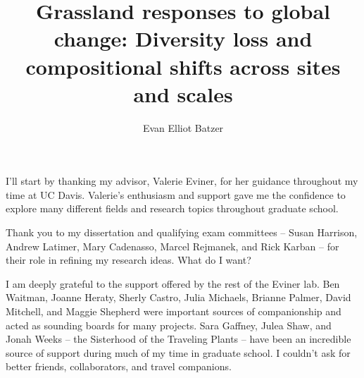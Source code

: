 \documentclass[twoside,12pt,final]{ucthesis-CA2012}
\begin{document}
\begin{ucfrontmatter}


  \title{Grassland responses to global change: Diversity loss and compositional shifts across sites and scales}
  \author{Evan Elliot Batzer}

   
  \othermemberC{} %
  
	\maketitle
	
  
\begin{acknowledgements}
    I'll start by thanking my advisor, Valerie Eviner, for her guidance throughout my time at UC Davis. Valerie's enthusiasm and support gave me the confidence to explore many different fields and research topics throughout graduate school.

    Thank you to my dissertation and qualifying exam committees -- Susan Harrison, Andrew Latimer, Mary Cadenasso, Marcel Rejmanek, and Rick Karban -- for their role in refining my research ideas. What do I want?

    I am deeply grateful to the support offered by the rest of the Eviner lab. Ben Waitman, Joanne Heraty, Sherly Castro, Julia Michaels, Brianne Palmer, David Mitchell, and Maggie Shepherd were important sources of companionship and acted as sounding boards for many projects. Sara Gaffney, Julea Shaw, and Jonah Weeks -- the Sisterhood of the Traveling Plants -- have been an incredible source of support during much of my time in graduate school. I couldn't ask for better friends, collaborators, and travel companions.


\end{acknowledgements}
\end{ucfrontmatter}
\end{document}
